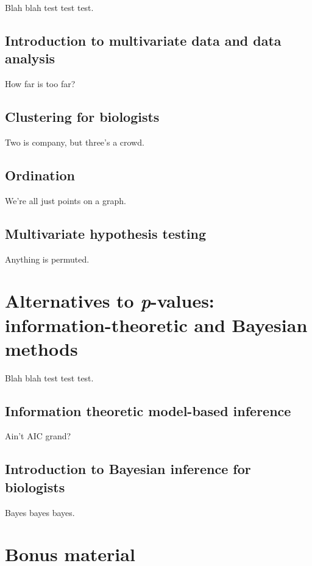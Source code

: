 \documentclass[
  13,
  letterpaper,
]{report}
\begin{document}
Blah blah test test test.

\chapter{Introduction to multivariate data and data
analysis}\label{sec-22}

How far is too far?

\chapter{Clustering for biologists}\label{sec-23}

Two is company, but three's a crowd.

\chapter{Ordination}\label{sec-24}

We're all just points on a graph.

\chapter{Multivariate hypothesis testing}\label{sec-25}

Anything is permuted.

\part{Alternatives to \emph{p}-values: information-theoretic and
Bayesian methods}

Blah blah test test test.

\chapter{Information theoretic model-based inference}\label{sec-26}

Ain't AIC grand?

\chapter{Introduction to Bayesian inference for
biologists}\label{sec-27}

Bayes bayes bayes.

\part{Bonus material}
\end{document}
